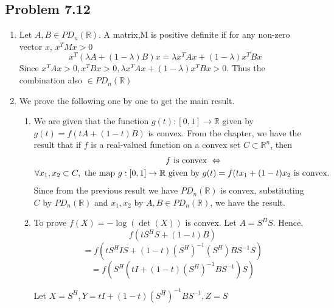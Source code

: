 \documentclass[letterpaper,12pt]{article}
\theoremstyle{definition}
\begin{document}
\subsection*{Problem 7.12}
\begin{enumerate}
    \item Let $ A,B \in PD_n(\mathbb{R})$. A matrix,M is positive definite if for any non-zero vector $x$, $ x^TMx>0 $
    \begin{equation*}
        x^T(\lambda A + (1-\lambda)B)x = \lambda x^TAx + (1-\lambda)x^TBx
    \end{equation*}
    Since $x^TAx > 0, x^TBx >0, \lambda x^TAx + (1-\lambda)x^TBx > 0 $. Thus the combination also $\in PD_n(\mathbb{R})$
    
    \item We prove the following one by one to get the main result.
    \begin{enumerate}
    \item We are given that the function $g(t): [0,1] \rightarrow \mathbb{R}$ given by $g(t) = f(tA + (1-t)B)$ is convex. 
    From the chapter, we have the result that if $f$ is a real-valued function on a convex set $C \subset \mathbb{R}^n$, then
    \begin{align*}
        &f \textnormal{ is convex } \Leftrightarrow \\
        \forall x_1, x_2 \subset C, \textnormal{ the map } g: [0,1] \rightarrow \mathbb{R}&\textnormal{ given by } g(t) = f(tx_1 + (1-t)x_2 \textnormal{ is convex.} \\
    \end{align*}
    Since from the previous result we have $PD_n(\mathbb{R})$ is convex, substituting $C$ by $PD_n(\mathbb{R})$ and $x_1, x_2$ by $A,B \in PD_n(\mathbb{R})$, we have the result.
    
    \item To prove $f(X) = -\log(\det(X))$ is convex.
    Let $A = S^HS$. Hence,
    \begin{equation*}
        f(tS^HS + (1-t)B)
    \end{equation*}
    \begin{equation*} 
    = f(tS^HIS + (1-t)(S^H)^{-1}(S^H)BS^{-1}S)
    \end{equation*}
    \begin{equation*}
                = f(S^H(tI + (1-t)(S^H)^{-1}BS^{-1})S)
    \end{equation*}

Let $ X = S^H, Y = tI + (1-t)(S^H)^{-1}BS^{-1}, Z = S $\\


\end{enumerate}
\end{enumerate}
\end{document}
